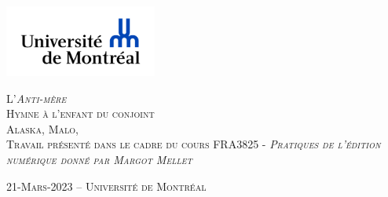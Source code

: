 \documentclass[12pt,french,letterpaper]{article}
\subtitle{Hymne à l'enfant du conjoint}
\author{Alaska    Malo    Université de Montréal }
\date{}
\begin{document}

\begin{titlepage}%
\begin{center}
    \enlargethispage{2cm}
    
\includegraphics[width = 50mm]{logo} %

\vspace*{3cm}
\scshape\Huge L'\emph{Anti-mère}\\
\normalfont\Large Hymne à l'enfant du conjoint\\
\large \vspace*{3cm}
Alaska,  Malo,  
\\
\normalsize\vspace*{1cm}Travail présenté dans le cadre du cours FRA3825 - \em Pratiques
de l'édition numérique
 \normalfont donné par Margot Mellet 

\vspace*{3cm}
\end{center}

\vspace*{\fill}
\begin{flushright}
\end{flushright}

\begin{center}
\scshape\normalsize\vspace*{1cm} 21-Mars-2023 --      Université de
Montréal 
\\
\end{center}
\end{titlepage}




\newpage 
\end{document}
